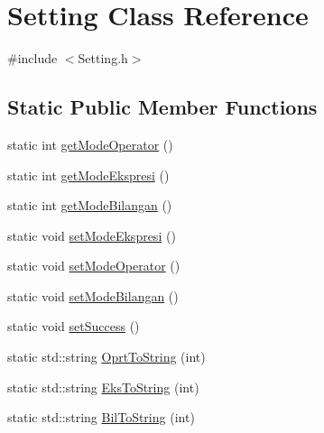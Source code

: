 \hypertarget{class_setting}{}\section{Setting Class Reference}
\label{class_setting}


{\ttfamily \#include $<$Setting.\+h$>$}

\subsection*{Static Public Member Functions}
\begin{DoxyCompactItemize}
\item 
static int \hyperlink{class_setting_a4b2e74f9386bc544d23867147f4a24ee}{get\+Mode\+Operator} ()
\item 
static int \hyperlink{class_setting_ae4792d0c2825129055317fe6af721b31}{get\+Mode\+Ekspresi} ()
\item 
static int \hyperlink{class_setting_a375de0a2fa8cea4d993731dd273995ca}{get\+Mode\+Bilangan} ()
\item 
static void \hyperlink{class_setting_a9453385952fe5902c5688e14afa4b373}{set\+Mode\+Ekspresi} ()
\item 
static void \hyperlink{class_setting_ad1b93830318c7ba4428a131717e5ea83}{set\+Mode\+Operator} ()
\item 
static void \hyperlink{class_setting_a9c0a3ef90259a49119f050d81d715953}{set\+Mode\+Bilangan} ()
\item 
static void \hyperlink{class_setting_a59ecfd5a0b66d37e816a86679e8ff8cd}{set\+Success} ()
\item 
static std\+::string \hyperlink{class_setting_a353179dedbcfd7c9428a9ebe37e9393d}{Oprt\+To\+String} (int)
\item 
static std\+::string \hyperlink{class_setting_acff93e9367acb3b3c36bfb56ed5be8f7}{Eks\+To\+String} (int)
\item 
static std\+::string \hyperlink{class_setting_af7686c86a0e69fa4db37352a76b04c6a}{Bil\+To\+String} (int)
\end{DoxyCompactItemize}

